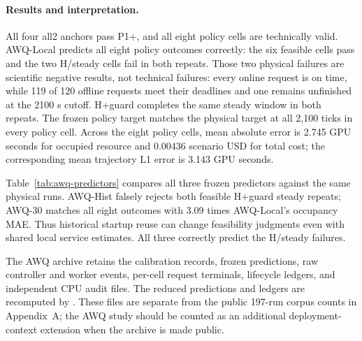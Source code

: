 \paragraph{Results and interpretation.}
All four all2 anchors pass P1+, and all eight policy cells are technically
valid. AWQ-Local predicts all eight policy outcomes correctly: the six feasible
cells pass and the two H/steady cells fail in both repeats. Those two physical
failures are scientific negative results, not technical failures: every online
request is on time, while 119 of 120 offline requests meet their deadlines and
one remains unfinished at the 2100 s cutoff. H+guard completes the same steady
window in both repeats. The frozen policy target matches the physical target at
all 2,100 ticks in every policy cell. Across the eight policy cells, mean
absolute error is 2.745 GPU seconds for occupied resource and 0.00436 scenario
USD for total cost; the corresponding mean trajectory L1 error is 3.143 GPU
seconds.

Table~\ref{tab:awq-predictors} compares all three frozen predictors against the
same physical runs. AWQ-Hist falsely rejects both feasible H+guard steady
repeats; AWQ-30 matches all eight outcomes with 3.09 times AWQ-Local's occupancy
MAE. Thus historical startup reuse can change feasibility judgments even with
shared local service estimates. All three correctly predict the H/steady failures.

The AWQ archive retains the calibration records, frozen predictions, raw
controller and worker events, per-cell request terminals, lifecycle ledgers,
and independent CPU audit files. The reduced predictions and ledgers are recomputed by
. These files are separate from the public
197-run corpus counts in Appendix~A; the AWQ study should be counted as an
additional deployment-context extension when the archive is made public.
